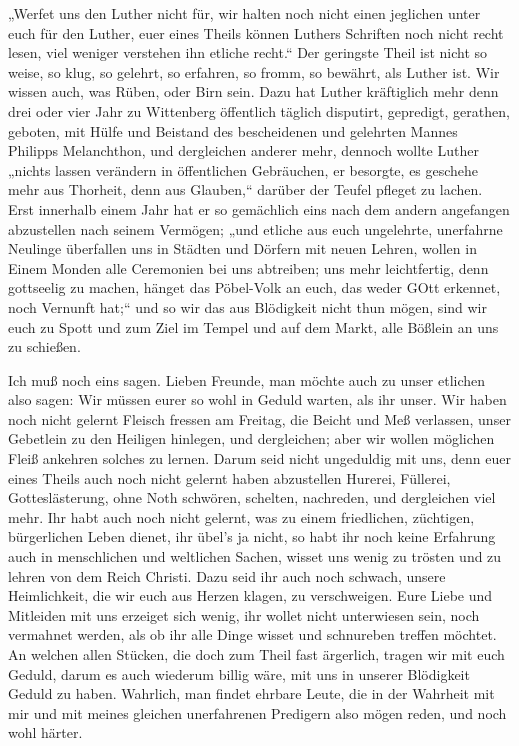 „Werfet uns den Luther nicht für, wir halten noch nicht einen jeglichen unter euch für den Luther, euer eines Theils können Luthers Schriften noch nicht recht lesen, viel weniger verstehen ihn etliche recht.“ Der geringste Theil ist nicht so weise, so klug, so gelehrt, so erfahren, so fromm, so bewährt, als Luther ist. Wir wissen auch, was Rüben, oder Birn sein. Dazu hat Luther kräftiglich mehr denn drei oder vier Jahr zu Wittenberg öffentlich täglich disputirt, gepredigt, gerathen, geboten, mit Hülfe und Beistand des bescheidenen und gelehrten Mannes Philipps Melanchthon, und dergleichen anderer mehr, dennoch wollte Luther „nichts lassen verändern in öffentlichen Gebräuchen, er besorgte, es geschehe mehr aus Thorheit, denn aus Glauben,“ darüber der Teufel pfleget zu lachen. Erst innerhalb einem Jahr hat er so gemächlich eins nach dem andern angefangen abzustellen nach seinem Vermögen; „und etliche aus euch
ungelehrte, unerfahrne Neulinge überfallen uns in Städten und Dörfern mit neuen Lehren, wollen in Einem Monden alle Ceremonien bei uns abtreiben; uns mehr leichtfertig, denn gottseelig zu machen, hänget das Pöbel-Volk an euch, das weder GOtt erkennet, noch Vernunft hat;“ und so wir das aus Blödigkeit nicht thun mögen, sind wir euch zu Spott und zum Ziel im Tempel und auf dem Markt, alle Bößlein an uns zu schießen.

Ich muß noch eins sagen. Lieben Freunde, man möchte auch zu unser etlichen also sagen: Wir müssen eurer so wohl in Geduld warten, als ihr unser. Wir haben noch nicht gelernt Fleisch fressen am Freitag, die Beicht und Meß verlassen, unser Gebetlein zu den Heiligen hinlegen, und dergleichen; aber wir wollen möglichen Fleiß ankehren solches zu lernen. Darum seid nicht ungeduldig mit uns, denn euer eines Theils auch noch nicht gelernt haben abzustellen Hurerei, Füllerei, Gotteslästerung, ohne Noth schwören, schelten, nachreden, und dergleichen viel mehr. Ihr habt auch noch nicht gelernt, was zu einem friedlichen, züchtigen, bürgerlichen Leben dienet, ihr übel's ja nicht, so habt ihr noch keine Erfahrung auch in menschlichen und weltlichen Sachen, wisset uns wenig zu trösten und zu lehren von dem Reich Christi. Dazu seid ihr auch noch schwach, unsere Heimlichkeit, die wir euch aus Herzen klagen, zu verschweigen. Eure Liebe und Mitleiden mit uns erzeiget sich wenig, ihr wollet nicht unterwiesen sein, noch vermahnet werden, als ob ihr alle Dinge wisset und schnureben treffen möchtet. An welchen allen Stücken, die doch zum Theil fast ärgerlich, tragen wir mit euch Geduld, darum es auch wiederum billig wäre, mit uns in unserer Blödigkeit Geduld zu haben. Wahrlich, man findet ehrbare Leute,
die in der Wahrheit mit mir und mit meines gleichen unerfahrenen Predigern also mögen reden, und noch wohl härter.

